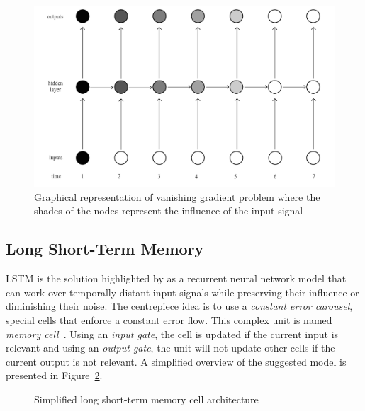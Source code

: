 \begin{figure}[htbp]
    \centering
    \includegraphics[page=1,width=\textwidth]{Figures/outputs_hiddenlayer.pdf}
    \caption{Graphical representation of vanishing gradient problem where the shades of the nodes represent the influence of the input signal~\cite{graves_long_2012}}%
    \label{fig:vanishing_gradients}
\end{figure}



\subsection{Long Short-Term Memory}%
\label{sub:lstm}

LSTM is the solution highlighted by \textcite{graves_long_2012} as a recurrent neural network model that can work over temporally distant input signals while preserving their influence or diminishing their noise.
The centrepiece idea is to use a \emph{constant error carousel}, special cells that enforce a constant error flow.
This complex unit is named \emph{memory cell}~\cite{hochreiter_long_1997}.
Using an \emph{input gate}, the cell is updated if the current input is relevant and using an \emph{output gate}, the unit will not update other cells if the current output is not relevant.
A simplified overview of the suggested model is presented in Figure~\ref{fig:simple_lstm}.

\begin{figure}[htbp]
    \centering
    \caption{Simplified long short-term memory cell architecture}%
    \label{fig:simple_lstm}
\end{figure}

